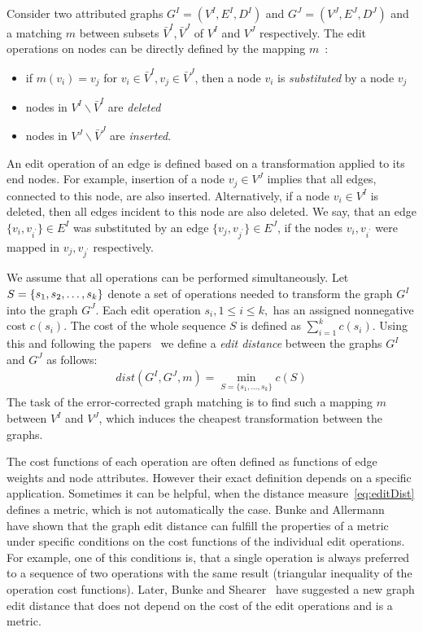 Consider two attributed graphs $G^I = (V^I, E^I,D^I)$ and $G^J = (V^J, E^J,D^J)$ and a matching $m$ between subsets $\bar{V}^I,\bar{V}^J$ of $V^I$ and $V^J$ respectively. The edit operations on nodes can be directly defined by the mapping $m$~\cite{Bunke1998_ErrTolerantGM}:
\begin{itemize}
	\item if $m(v_i)=v_j$ for $v_i\in\bar{V}^I,v_j\in\bar{V}^J$, then a node $v_i$ is \emph{substituted} by a node $v_j$
	\item nodes in $V^I\backslash\bar{V}^I$ are \emph{deleted}
	\item nodes in $V^J\backslash\bar{V}^J$ are \emph{inserted}.
\end{itemize}
An edit operation of an edge is defined based on a transformation applied to its end nodes. For example, insertion of a node $v_j\in V^J$ implies that all edges, connected to this node, are also inserted. Alternatively, if a node $v_i\in V^I$ is deleted, then all edges incident to this node are also deleted. We say, that an edge $\{v_i,v_{i^\prime}\}\in E^I$ was substituted by an edge $\{v_j,v_{j^\prime}\}\in E^J$, if the nodes $v_i,v_{i^\prime}$ were mapped in $v_j,v_{j^\prime}$ respectively.

We assume that all operations can be performed simultaneously. Let $S=\{s_1,s_2,\dots,\newline s_k\}$ denote a set of operations needed to transform the graph $G^I$ into the graph $G^J$. 
Each edit operation $s_i, 1\le i\le k,$ has an assigned nonnegative cost $c(s_i)$. The cost of the whole sequence $S$ is defined as $\sum_{i=1}^{k}c(s_i)$. Using this and following the papers~\cite{Bunke1983_inexactGM, Wang1995} we define a \emph{edit distance} between the graphs $G^I$ and $G^J$ as follows:
\begin{eqnarray} \label{eq:editDist}
dist(G^I,G^J,m) = \min\limits_{S=\{s_1,\dots,s_k\}}c(S)
\end{eqnarray}
The task of the error-corrected graph matching is to find such a mapping $m$ between $V^I$ and $V^J$, which induces the cheapest transformation between the graphs.

The cost functions of each operation are often defined as functions of edge weights and node attributes. However their exact definition depends on a specific application. Sometimes it can be helpful, when the distance measure~\eqref{eq:editDist} defines a metric, which is not automatically the case. Bunke and Allermann~\cite{Bunke1983_inexactGM} have shown that the graph edit distance can fulfill the properties of a metric under specific conditions on the cost functions of the individual edit operations. For example, one of this conditions is, that a single operation is always preferred to a sequence of two operations with the same result (triangular inequality of the operation cost functions). Later, Bunke and Shearer~\cite{Bunke1998_graphDist} have suggested a new graph edit distance that does not depend on the cost of the edit operations and is a metric.

